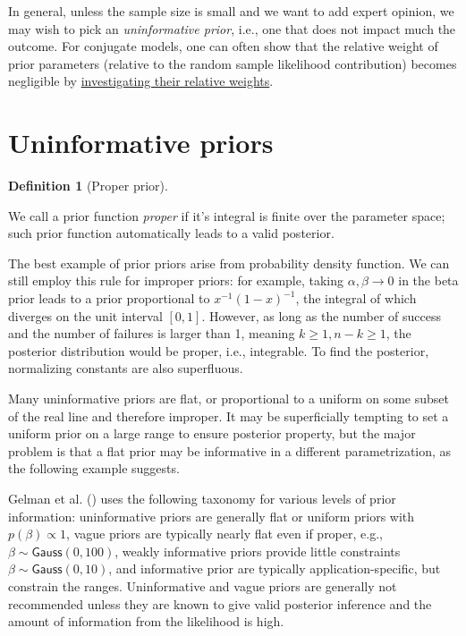 \documentclass[
  11pt,
  letterpaper,
]{scrbook}
\theoremstyle{definition}
\theoremstyle{plain}
\theoremstyle{plain}
\theoremstyle{definition}
\theoremstyle{definition}
\newtheorem{definition}{Definition}[chapter]
\theoremstyle{remark}
\begin{document}
In general, unless the sample size is small and we want to add expert
opinion, we may wish to pick an \emph{uninformative prior}, i.e., one
that does not impact much the outcome. For conjugate models, one can
often show that the relative weight of prior parameters (relative to the
random sample likelihood contribution) becomes negligible by
\href{https://en.wikipedia.org/wiki/Conjugate_prior}{investigating their
relative weights}.

\section{Uninformative priors}\label{uninformative-priors}

\begin{definition}[Proper
prior]\protect\hypertarget{def-properprior}{}\label{def-properprior}

We call a prior function \emph{proper} if it's integral is finite over
the parameter space; such prior function automatically leads to a valid
posterior.

\end{definition}

The best example of prior priors arise from probability density
function. We can still employ this rule for improper priors: for
example, taking \(\alpha, \beta \to 0\) in the beta prior leads to a
prior proportional to \(x^{-1}(1-x)^{-1}\), the integral of which
diverges on the unit interval \([0,1]\). However, as long as the number
of success and the number of failures is larger than 1, meaning
\(k \geq 1, n-k \geq 1\), the posterior distribution would be proper,
i.e., integrable. To find the posterior, normalizing constants are also
superfluous.

Many uninformative priors are flat, or proportional to a uniform on some
subset of the real line and therefore improper. It may be superficially
tempting to set a uniform prior on a large range to ensure posterior
property, but the major problem is that a flat prior may be informative
in a different parametrization, as the following example suggests.

Gelman et al. () uses the following
taxonomy for various levels of prior information: uninformative priors
are generally flat or uniform priors with \(p(\beta) \propto 1\), vague
priors are typically nearly flat even if proper, e.g.,
\(\beta \sim \mathsf{Gauss}(0, 100)\), weakly informative priors provide
little constraints \(\beta \sim \mathsf{Gauss}(0, 10)\), and informative
prior are typically application-specific, but constrain the ranges.
Uninformative and vague priors are generally not recommended unless they
are known to give valid posterior inference and the amount of
information from the likelihood is high.
\end{document}

